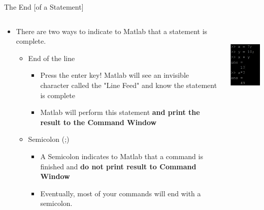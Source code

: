 {}\documentclass[letterpaper,
compress,
xcolor=x11names,
]{beamer}
\begin{document}
\begin{frame}{The End [of a Statement]}
	\footnotesize
	\begin{columns}
		\begin{column}{0.65\linewidth}
			\begin{itemize}
				\item There are two ways to indicate to Matlab that a statement is complete.
				\begin{itemize}
					\item End of the line
						\begin{itemize}
							\item Press the enter key! Matlab will see an invisible character called the "Line Feed" and know the statement is complete
							\item Matlab will perform this statement \textbf{and print the result to the Command Window}
						\end{itemize}
					\item Semicolon (;)
						\begin{itemize}
							\item A Semicolon indicates to Matlab that a command is finished and \textbf{do not print result to Command Window} 
							\item Eventually, most of your commands will end with a semicolon.
						\end{itemize}
				\end{itemize}
			\end{itemize}
		\end{column}
		\begin{column}{0.3\linewidth}
			\begin{center}
				\includegraphics[height = 4cm]{Variables.png}
			\end{center}
		\end{column}
	\end{columns}
\end{frame}
\end{document}
